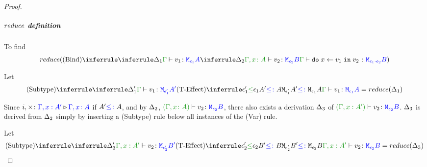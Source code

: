 \documentclass{report}
\begin{document}
\begin{framed}
\begin{proof}
        
                    \case{\vbind}
                    \subparagraph{$reduce$ definition}
        
                    To find
                    \begin{equation}
                        \reduce(
                            \ntreeruleII{\vbind}{
                                \treeruleI{
                                    \D_1
                                }{
                                    \gtyperelation{v_1}{\M{\e_1}{A}}
                                }
                                }{
                                \treeruleI{
                                    \D_2
                                }{
                                    \typerelation{\gax}{v_2}{\M{\e_2}{B}}
                                }
                            } {
                                \gtyperelation{\doin{x}{v_1}{v_2}}{\M{\e_1\dot\e_2}{B}}
                            }
                        )
                    \end{equation}
        
                    Let \begin{equation}
                        \ntreeruleII{\vsubtype}{
                            \treeruleI{\D'_1}{\gtyperelation{v_1}{\M{\e'_1}{A'}}}
                        }{
                            \subeffecttree{\e_1'}{A'}{\e_1}{A}
                        }{
                            \gtyperelation{v_1}{\M{\e_1}{A}}
                        } = \reduce(\D_1)
                    \end{equation}
        
                    Since $i,\times \colon {\color{blue}\Gamma, x: A'} \triangleright {\color {blue} \Gamma, x\colon A}$ if $A' {\color{blue} \leq\colon} A$, and by $\Delta_2$, $\typerelation{(\gax)}{v_2}{\M{\e_2}{B}}$, there also exists a derivation $\Delta_3$ of $\typerelation{(\G, x: A')}{v_2}{\M{\e_2}{B}}$. $\Delta_3$ is derived from $\Delta_2$ simply by inserting a (Subtype) rule below all instances of the (Var) rule.
        
                    Let \begin{equation}
                        \ntreeruleII{\vsubtype}{
                            \treeruleI{\D'_3}{\typerelation{\G, x: A'}{v_2}{\M{\e'_2}{B'}}}
                        }{
                            \subeffecttree{\e_2'}{B'}{\e_2}{B}
                        }{
                            \typerelation{\G, x: A'}{v_2}{\M{\e_2}{B}}
                        } = \reduce(\D_3)
                    \end{equation}
                    

\end{proof}
\end{framed}
\end{document}
